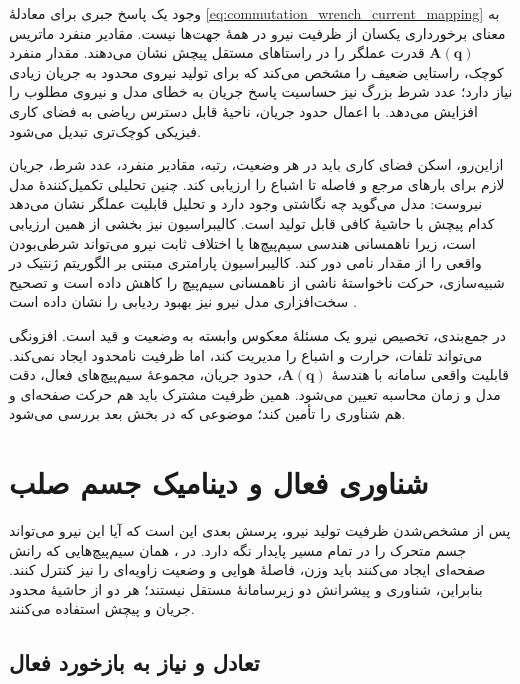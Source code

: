 وجود یک پاسخ جبری برای معادلهٔ \ref{eq:commutation_wrench_current_mapping} به معنای برخورداری یکسان از ظرفیت نیرو در همهٔ جهت‌ها نیست. مقادیر منفرد ماتریس $\mathbf{A}(\mathbf{q})$ قدرت عملگر را در راستاهای مستقل پیچش نشان می‌دهند. مقدار منفرد کوچک، راستایی ضعیف را مشخص می‌کند که برای تولید نیروی محدود به جریان زیادی نیاز دارد؛ عدد شرط بزرگ نیز حساسیت پاسخ جریان به خطای مدل و نیروی مطلوب را افزایش می‌دهد. با اعمال حدود جریان، ناحیهٔ قابل دسترس ریاضی به فضای کاری فیزیکی کوچک‌تری تبدیل می‌شود.

ازاین‌رو، اسکن فضای کاری باید در هر وضعیت، رتبه، مقادیر منفرد، عدد شرط، جریان لازم برای بارهای مرجع و فاصله تا اشباع را ارزیابی کند. چنین تحلیلی تکمیل‌کنندهٔ مدل نیروست: مدل می‌گوید چه نگاشتی وجود دارد و تحلیل قابلیت عملگر نشان می‌دهد کدام پیچش با حاشیهٔ کافی قابل تولید است. کالیبراسیون نیز بخشی از همین ارزیابی است، زیرا ناهمسانی هندسی سیم‌پیچ‌ها یا اختلاف ثابت نیرو می‌تواند شرطی‌بودن واقعی را از مقدار نامی دور کند. کالیبراسیون پارامتری مبتنی بر الگوریتم ژنتیک در شبیه‌سازی، حرکت ناخواستهٔ ناشی از ناهمسانی سیم‌پیچ را کاهش داده است \cite{chenModelCalibrationInconsistent2024} و تصحیح سخت‌افزاری مدل نیرو نیز بهبود ردیابی را نشان داده است \cite{nakataCompensationFEMBased2026}.

\label{subsec:commutation_summary}
در جمع‌بندی، تخصیص نیرو یک مسئلهٔ معکوس وابسته به وضعیت و قید است. افزونگی می‌تواند تلفات، حرارت و اشباع را مدیریت کند، اما ظرفیت نامحدود ایجاد نمی‌کند. قابلیت واقعی سامانه با هندسهٔ $\mathbf{A}(\mathbf{q})$، حدود جریان، مجموعهٔ سیم‌پیچ‌های فعال، دقت مدل و زمان محاسبه تعیین می‌شود. همین ظرفیت مشترک باید هم حرکت صفحه‌ای و هم شناوری را تأمین کند؛ موضوعی که در بخش بعد بررسی می‌شود.


\section{شناوری فعال و دینامیک جسم صلب}
\label{sec:levitation-stability-coupled-dynamics}

پس از مشخص‌شدن ظرفیت تولید نیرو، پرسش بعدی این است که آیا این نیرو می‌تواند جسم متحرک را در تمام مسیر پایدار نگه دارد. در ، همان سیم‌پیچ‌هایی که رانش صفحه‌ای ایجاد می‌کنند باید وزن، فاصلهٔ هوایی و وضعیت زاویه‌ای را نیز کنترل کنند. بنابراین، شناوری و پیشرانش دو زیرسامانهٔ مستقل نیستند؛ هر دو از حاشیهٔ محدود جریان و پیچش استفاده می‌کنند.

\subsection{تعادل و نیاز به بازخورد فعال}
\label{subsec:magnetic-equilibrium-stiffness}

